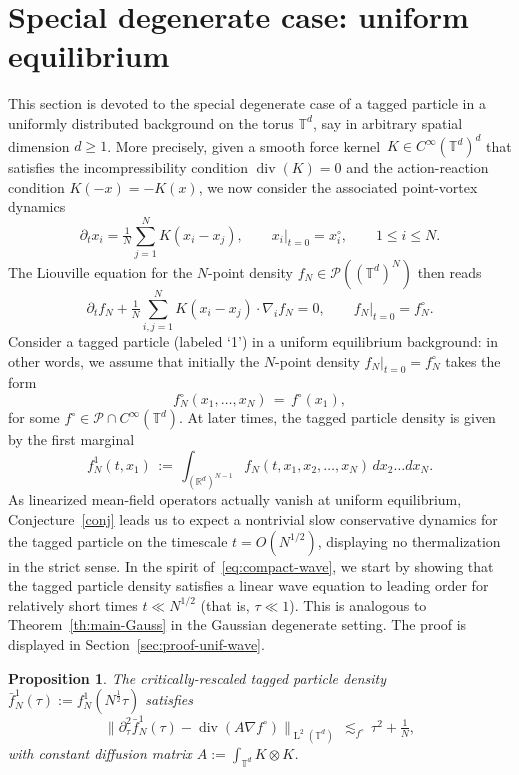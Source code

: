 \documentclass[a4paper,11pt,reqno,noindent]{amsart}
\theoremstyle{plain}
\newtheorem{prop}[lem]{Proposition}
\numberwithin{equation}{section}
\newcommand{\R}{\mathbb R}
\newcommand{\T}{\mathbb T}
\newcommand{\Pc}{\mathcal P}
\newcommand{\Div}{{\operatorname{div}}}
\newcommand{\3}{|\!|\!|}
\newcommand{\Ld}{\operatorname{L}}
\begin{document}
\section{Special degenerate case: uniform equilibrium}\label{sec:unif}

This section is devoted to the special degenerate case of a tagged particle in a uniformly distributed background on the torus $\T^d$, say in arbitrary spatial dimension $d\ge1$.
More precisely, given a smooth force kernel~$K\in C^\infty(\T^d)^d$ that satisfies the incompressibility condition $\Div(K)=0$ and the action-reaction condition \mbox{$K(-x)=-K(x)$}, we now consider the associated point-vortex dynamics
\[\partial_tx_i=\tfrac1N\sum_{j=1}^NK(x_i-x_j),\qquad x_i|_{t=0}=x_i^\circ,\qquad 1\le i\le N.\]
The Liouville equation for the $N$-point density $f_N\in\Pc((\T^d)^N)$ then reads
\begin{equation}\label{eq:Liouville}
\partial_tf_N+\tfrac1N\sum_{i,j=1}^NK(x_i-x_j)\cdot\nabla_if_N=0,\qquad f_N|_{t=0}=f_N^\circ.
\end{equation}
Consider a tagged particle (labeled `1') in a uniform equilibrium background: in other words, we assume that initially the $N$-point density $f_N|_{t=0}=f_N^\circ$ takes the form
\begin{equation}\label{eq:initial-unif}
f_N^{\circ}(x_1,\ldots,x_N)\,=\,f^{\circ}(x_1),
\end{equation}
for some $f^{\circ}\in \Pc\cap C^\infty(\T^d)$.
At later times, the tagged particle density is given by the first marginal
\[f_N^1(t,x_1)\,:=\,\int_{(\R^d)^{N-1}}f_N(t,x_1,x_2,\ldots,x_N)\,dx_2\ldots dx_N.\]
As linearized mean-field operators actually vanish at uniform equilibrium, Conjecture~\ref{conj} leads us to expect a nontrivial slow conservative dynamics for the tagged particle on the timescale $t=O(N^{1/2})$, displaying no thermalization in the strict sense.
In the spirit of~\eqref{eq:compact-wave}, we start by showing that the tagged particle density satisfies a linear wave equation to leading order for relatively short times $t\ll N^{1/2}$ (that is, $\tau\ll1$). This is analogous to Theorem~\ref{th:main-Gauss} in the Gaussian degenerate setting.
The proof is displayed in Section~\ref{sec:proof-unif-wave}.

\begin{prop}\label{prop:unif-wave}
The critically-rescaled tagged particle density
$\bar f_N^1(\tau):=f_N^1(N^{\frac12}\tau)$
satisfies
\[\|\partial_\tau^2\bar f_N^{1}(\tau)-\Div(A\nabla f^{\circ})\|_{\Ld^2(\T^d)}\,\lesssim_{f^\circ}\,\tau^2+\tfrac1N,\]
with constant diffusion matrix
$A:=\int_{\T^d}K\otimes K$.
\end{prop}
\end{document}
